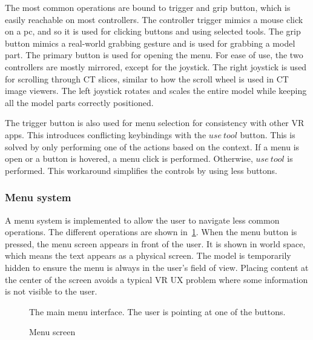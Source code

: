 \documentclass[a4paper]{report}
\begin{document}
The most common operations are bound to trigger and grip button, which is easily reachable on most controllers. The controller trigger mimics a mouse click on a pc, and so it is used for clicking buttons and using selected tools. The grip button mimics a real-world grabbing gesture and is used for grabbing a model part.
The primary button is used for opening the menu.
For ease of use, the two controllers are mostly mirrored, except for the joystick. The right joystick is used for scrolling through CT slices, similar to how the scroll wheel is used in CT image viewers. The left joystick rotates and scales the entire model while keeping all the model parts correctly positioned.

The trigger button is also used for menu selection for consistency with other VR apps. This introduces conflicting keybindings with the $use\ tool$ button. This is solved by only performing one of the actions based on the context. If a menu is open or a button is hovered, a menu click is performed. Otherwise, $use\ tool$ is performed. This workaround simplifies the controls by using less buttons.

\subsubsection{Menu system}
A menu system is implemented to allow the user to navigate less common operations. The different operations are shown in~\ref{menu}.
When the menu button is pressed, the menu screen appears in front of the user. It is shown in world space, which means the text appears as a physical screen. The model is temporarily hidden to ensure the menu is always in the user's field of view. Placing content at the center of the screen avoids a typical VR UX problem where some information is not visible to the user.

\begin{figure}[h!]
    \centering
	\hfill
	\caption{Menu screen}\label{menu}
  \small
  The main menu interface. The user is pointing at one of the buttons.
\end{figure}
\end{document}
